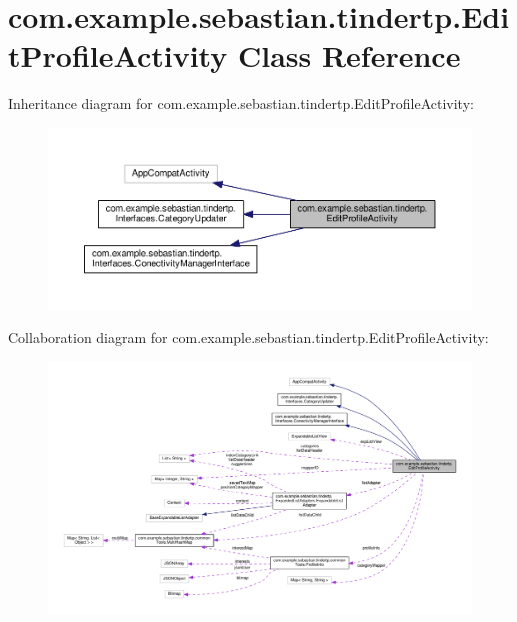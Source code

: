 \hypertarget{classcom_1_1example_1_1sebastian_1_1tindertp_1_1EditProfileActivity}{}\section{com.\+example.\+sebastian.\+tindertp.\+Edit\+Profile\+Activity Class Reference}
\label{classcom_1_1example_1_1sebastian_1_1tindertp_1_1EditProfileActivity}


Inheritance diagram for com.\+example.\+sebastian.\+tindertp.\+Edit\+Profile\+Activity\+:\nopagebreak
\begin{figure}[H]
\begin{center}
\leavevmode
\includegraphics[width=350pt]{classcom_1_1example_1_1sebastian_1_1tindertp_1_1EditProfileActivity__inherit__graph}
\end{center}
\end{figure}


Collaboration diagram for com.\+example.\+sebastian.\+tindertp.\+Edit\+Profile\+Activity\+:\nopagebreak
\begin{figure}[H]
\begin{center}
\leavevmode
\includegraphics[width=350pt]{classcom_1_1example_1_1sebastian_1_1tindertp_1_1EditProfileActivity__coll__graph}
\end{center}
\end{figure}
